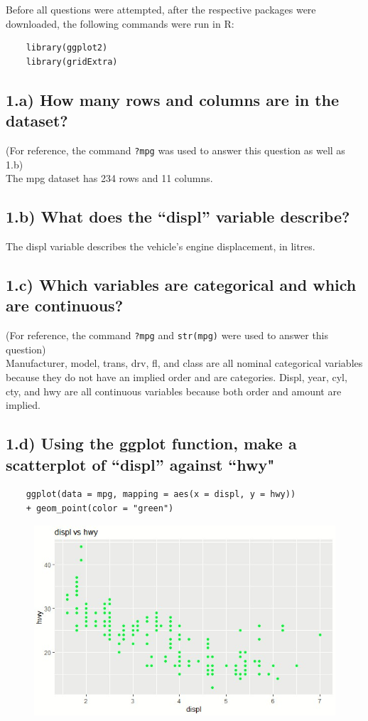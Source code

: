 \documentclass[11pt]{article}
\begin{document}
Before all questions were attempted, after the respective packages were downloaded, the following commands were run in R:

\begin{verbatim}
    library(ggplot2)
    library(gridExtra)
\end{verbatim}

\subsection*{1.a) How many rows and columns are in the dataset?}
(For reference, the command \verb|?mpg| was used to answer this question as well as 1.b) \\
The mpg dataset has 234 rows and 11 columns.

\subsection*{1.b) What does the “displ” variable describe?}
The displ variable describes the vehicle's engine displacement, in litres. 

\subsection*{1.c) Which variables are categorical and which are continuous?}
(For reference, the command \verb|?mpg| and \verb|str(mpg)| were used to answer this question) \\
Manufacturer, model, trans, drv, fl, and class are all nominal categorical variables because they do not have an implied order and are categories. Displ, year, cyl, cty, and hwy are all continuous variables because both order and amount are implied.

\subsection*{1.d) Using the ggplot function, make a scatterplot of “displ” against “hwy"}
\begin{verbatim}
    ggplot(data = mpg, mapping = aes(x = displ, y = hwy)) 
    + geom_point(color = "green")
\end{verbatim}

\begin{figure}[h]
\includegraphics[width = 12cm]{1d.jpg}
\centering
\end{figure}
\end{document}
